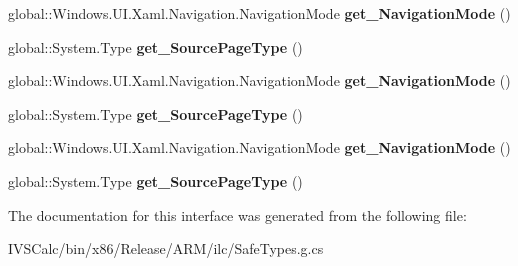 \begin{DoxyCompactItemize}
global\+::\+Windows.\+U\+I.\+Xaml.\+Navigation.\+Navigation\+Mode {\bfseries get\+\_\+\+Navigation\+Mode} ()
\item 
\mbox{\label{interface_windows_1_1_u_i_1_1_xaml_1_1_navigation_1_1_i_navigating_cancel_event_args_a07df841493a0cda65a658ad6e960d974}} 
global\+::\+System.\+Type {\bfseries get\+\_\+\+Source\+Page\+Type} ()
\item 
\mbox{\label{interface_windows_1_1_u_i_1_1_xaml_1_1_navigation_1_1_i_navigating_cancel_event_args_a8acff91018a3d93f50617c9a48b0c289}} 
global\+::\+Windows.\+U\+I.\+Xaml.\+Navigation.\+Navigation\+Mode {\bfseries get\+\_\+\+Navigation\+Mode} ()
\item 
\mbox{\label{interface_windows_1_1_u_i_1_1_xaml_1_1_navigation_1_1_i_navigating_cancel_event_args_a07df841493a0cda65a658ad6e960d974}} 
global\+::\+System.\+Type {\bfseries get\+\_\+\+Source\+Page\+Type} ()
\item 
\mbox{\label{interface_windows_1_1_u_i_1_1_xaml_1_1_navigation_1_1_i_navigating_cancel_event_args_a8acff91018a3d93f50617c9a48b0c289}} 
global\+::\+Windows.\+U\+I.\+Xaml.\+Navigation.\+Navigation\+Mode {\bfseries get\+\_\+\+Navigation\+Mode} ()
\item 
\mbox{\label{interface_windows_1_1_u_i_1_1_xaml_1_1_navigation_1_1_i_navigating_cancel_event_args_a07df841493a0cda65a658ad6e960d974}} 
global\+::\+System.\+Type {\bfseries get\+\_\+\+Source\+Page\+Type} ()
\end{DoxyCompactItemize}


The documentation for this interface was generated from the following file\+:\begin{DoxyCompactItemize}
\item 
I\+V\+S\+Calc/bin/x86/\+Release/\+A\+R\+M/ilc/Safe\+Types.\+g.\+cs\end{DoxyCompactItemize}

